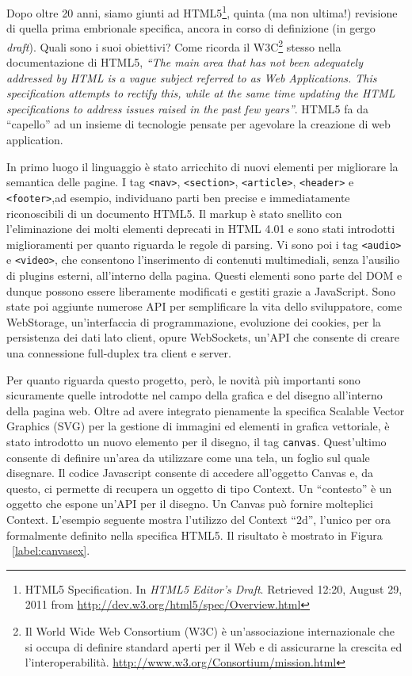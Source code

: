 Dopo oltre 20 anni, siamo giunti ad HTML5\footnote{HTML5 Specification. In \textit{HTML5 Editor's Draft}. Retrieved 12:20, August 29, 2011 from \url{http://dev.w3.org/html5/spec/Overview.html}}, quinta (ma non ultima!) revisione di quella prima embrionale specifica, ancora in corso di definizione (in gergo \textit{draft}). Quali sono i suoi obiettivi? Come ricorda il W3C\footnote{Il World Wide Web Consortium (W3C) è un'associazione internazionale che si occupa di definire standard aperti per il Web e di assicurarne la crescita ed l'interoperabilità. \url{http://www.w3.org/Consortium/mission.html}} stesso nella documentazione di HTML5, \textit{“The main area that has not been adequately addressed by HTML is a vague subject referred to as Web Applications. This specification attempts to rectify this, while at the same time updating the HTML specifications to address issues raised in the past few years”}. HTML5 fa da “capello” ad un insieme di tecnologie pensate per agevolare la creazione di web application.

In primo luogo il linguaggio è stato arricchito di nuovi elementi per migliorare la semantica delle pagine. I tag \texttt{<nav>}, \texttt{<section>}, \texttt{<article>}, \texttt{<header>} e \texttt{<footer>},ad esempio, individuano parti ben precise e immediatamente riconoscibili di un documento HTML5. Il markup è stato snellito con l'eliminazione dei molti elementi deprecati in HTML 4.01 e sono stati introdotti miglioramenti per quanto riguarda le regole di parsing. Vi sono poi i tag \texttt{<audio>} e \texttt{<video>}, che consentono l'inserimento di contenuti multimediali, senza l'ausilio di plugins esterni, all'interno della pagina. Questi elementi sono parte del DOM e dunque possono essere liberamente modificati e gestiti grazie a JavaScript. Sono state poi aggiunte numerose API per semplificare la vita dello sviluppatore, come WebStorage, un'interfaccia di programmazione, evoluzione dei cookies, per la persistenza dei dati lato client, opure WebSockets, un'API che consente di creare una connessione full-duplex tra client e server. 

Per quanto riguarda questo progetto, però, le novità più importanti sono sicuramente quelle introdotte nel campo della grafica e del disegno all'interno della pagina web. Oltre ad avere integrato pienamente la specifica Scalable Vector Graphics (SVG) per la gestione di immagini ed elementi in grafica vettoriale, è stato introdotto un nuovo elemento per il disegno, il tag \texttt{canvas}. Quest'ultimo consente di definire un'area da utilizzare come una tela, un foglio sul quale disegnare. Il codice Javascript consente di accedere all'oggetto Canvas e, da questo, ci permette di recupera un oggetto di tipo Context. Un ``contesto'' è un oggetto che espone un'API per il disegno. Un Canvas può fornire molteplici Context. L'esempio seguente mostra l'utilizzo del Context ``2d'', l'unico per ora formalmente definito nella specifica HTML5. Il risultato è mostrato in Figura ~\ref{label:canvasex}.


